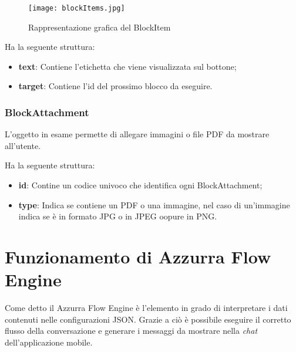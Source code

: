 \begin{figure}[h]
	\centering
	\texttt{[image: blockItems.jpg]}
	\caption{Rappresentazione grafica del BlockItem}
\end{figure}
Ha la seguente struttura:

\begin{itemize}
	\item \textbf{text}: Contiene l'etichetta che viene visualizzata sul bottone;
	\item \textbf{target}: Contiene l'id del prossimo blocco da eseguire.
\end{itemize}



\subsubsection*{BlockAttachment} 
L'oggetto in esame permette di allegare immagini o file PDF da mostrare all'utente.

Ha la seguente struttura:

\begin{itemize}
	\item \textbf{id}: Contine un codice univoco che identifica ogni BlockAttachment;
	\item \textbf{type}: Indica se contiene un PDF o una immagine, nel caso di un'immagine indica se è in formato JPG o in JPEG oopure in PNG.
\end{itemize}	

\section{Funzionamento di Azzurra Flow Engine}
Come detto il Azzurra Flow Engine è l'elemento in grado di interpretare i dati contenuti nelle configurazioni JSON. Grazie a ciò è possibile eseguire il corretto flusso della conversazione e generare i messaggi da mostrare nella \emph{chat} dell'applicazione mobile. 
